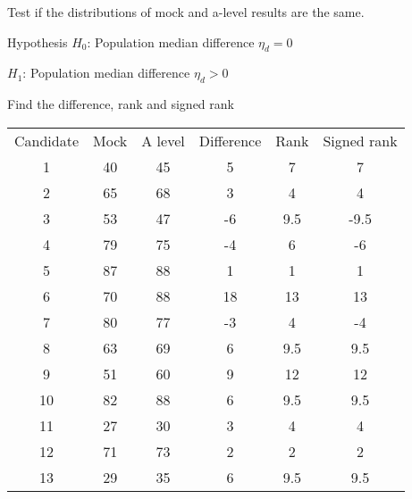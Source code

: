         \begin{example}
        {
            Test if the distributions of mock and a-level results are the same.
        }
            
        \begin{step}{Hypothesis}
        $H_0$: Population median difference $\eta_d = 0$
        
        $H_1$: Population median difference $\eta_d > 0$
        \end{step}
        
        \begin{step}{Find the difference, rank and signed rank}
        \begin{center}
        \begin{tabular}{c|c|c|c|c|c}
            Candidate & Mock & A level & Difference & Rank & Signed rank \\
            1         & 40   & 45      & 5          & 7    & 7           \\
            2         & 65   & 68      & 3          & 4    & 4           \\
            3         & 53   & 47      & -6         & 9.5  & -9.5        \\
            4         & 79   & 75      & -4         & 6    & -6          \\
            5         & 87   & 88      & 1          & 1    & 1           \\
            6         & 70   & 88      & 18         & 13   & 13          \\
            7         & 80   & 77      & -3         & 4    & -4          \\
            8         & 63   & 69      & 6          & 9.5  & 9.5         \\
            9         & 51   & 60      & 9          & 12   & 12          \\
            10        & 82   & 88      & 6          & 9.5  & 9.5         \\
            11        & 27   & 30      & 3          & 4    & 4           \\
            12        & 71   & 73      & 2          & 2    & 2           \\
            13        & 29   & 35      & 6          & 9.5  & 9.5         \\
        \end{tabular}
        \end{center}
        \end{step}
        

\end{example}
